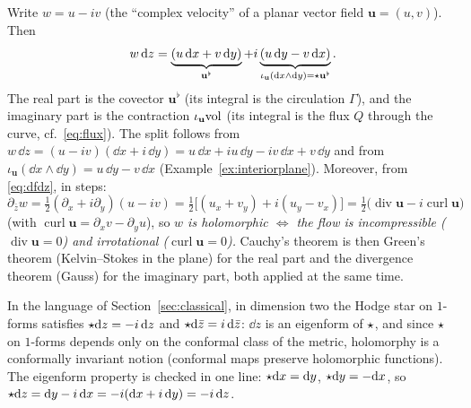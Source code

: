 Write $w=u-iv$ (the ``complex velocity'' of a planar vector field $\mathbf u=(u,v)$). Then
\begin{equation}\label{eq:wdz}
w\,\dd z=\underbrace{(u\,\dd x+v\,\dd y)}_{\mathbf u^\flat}+i\underbrace{(u\,\dd y-v\,\dd x)}_{\iota_{\mathbf u}(\dd x\wedge\dd y)=\hodge\mathbf u^\flat}.
\end{equation}
The real part is the covector $\mathbf u^\flat$ (its integral is the circulation $\Gamma$), and the imaginary part is the contraction $\iota_{\mathbf u}\mathrm{vol}$ (its integral is the flux $Q$ through the curve, cf.\ \eqref{eq:flux}). The split follows from $w\,\dd z=(u-iv)(\dd x+i\,\dd y)=u\,\dd x+iu\,\dd y-iv\,\dd x+v\,\dd y$ and from $\iota_{\mathbf u}(\dd x\wedge\dd y)=u\,\dd y-v\,\dd x$ (Example~\ref{ex:interiorplane}). Moreover, from \eqref{eq:dfdz}, in steps:
\[
\partial_{\bar z}w=\tfrac12(\partial_x+i\partial_y)(u-iv)=\tfrac12\bigl[(u_x+v_y)+i(u_y-v_x)\bigr]=\tfrac12\bigl(\operatorname{div}\mathbf u-i\operatorname{curl}\mathbf u\bigr)
\]
(with $\operatorname{curl}\mathbf u=\partial_xv-\partial_yu$), 
so \emph{$w$ is holomorphic $\iff$ the flow is incompressible ($\operatorname{div}\mathbf u=0$) and irrotational ($\operatorname{curl}\mathbf u=0$).}
Cauchy's theorem is then Green's theorem (Kelvin--Stokes in the plane) for the real part and the divergence theorem (Gauss) for the imaginary part, both applied at the same time.

\begin{specialcase}\label{sc:hodge2}
In the language of Section~\ref{sec:classical}, in dimension two the Hodge star on $1$-forms satisfies $\star\mathrm{d} z=-i\,\mathrm{d} z$ and $\star\mathrm{d}\bar z=i\,\mathrm{d}\bar z$: $\dd z$ is an eigenform of $\star$, and since $\star$ on $1$-forms depends only on the conformal class of the metric, holomorphy is a conformally invariant notion (conformal maps preserve holomorphic functions). The eigenform property is checked in one line: $\star\mathrm{d} x=\mathrm{d} y$, $\star\mathrm{d} y=-\mathrm{d} x$, so $\star\mathrm{d} z=\mathrm{d} y-i\,\mathrm{d} x=-i(\mathrm{d} x+i\,\mathrm{d} y)=-i\,\mathrm{d} z$.
\end{specialcase}
